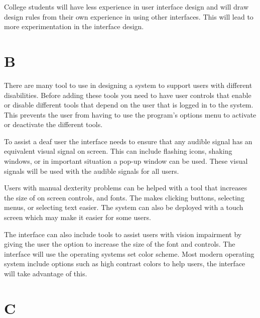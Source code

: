 \documentclass[12pt]{article}
\begin{document}
College students will have less experience in user interface design and 
will draw design rules from their own experience in using other interfaces.
This will lead to more experimentation in the interface design.  

\section*{B}

There are many tool to use in designing a system to support users with 
different disabilities.  Before adding these tools you need to have user
controls that enable or disable different tools that depend on the user
that is logged in to the system.  This prevents the user from having to
use the program's options menu to activate or deactivate the different
tools.

To assist a deaf user the interface needs to ensure that any audible signal
has an equivalent visual signal on screen.  This can include flashing 
icons, shaking windows, or in important situation a pop-up window can
be used.  These visual signals will be used with the audible signals for
all users.

Users with manual dexterity problems can be helped with a tool that
increases the size of on screen controls, and fonts.  The makes clicking
buttons, selecting menus, or selecting text easier.  The system can also
be deployed with a touch screen which may make it easier for some users.

The interface can also include tools to assist users with vision 
impairment by giving the user the option to increase the size of the font
and controls.  The interface will use the operating systems set color
scheme.  Most modern operating system include options such as high contrast
colors to help users, the interface will take advantage of this.

\section*{C}
\end{document}
